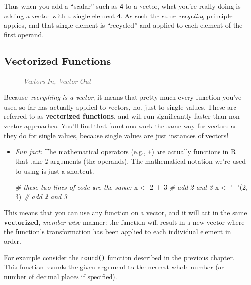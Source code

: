 \documentclass[]{book}
\newenvironment{Shaded}{\begin{snugshade}}{\end{snugshade}}
\newcommand{\DecValTok}[1]{\textcolor[rgb]{0.00,0.00,0.81}{#1}}
\newcommand{\StringTok}[1]{\textcolor[rgb]{0.31,0.60,0.02}{#1}}
\newcommand{\CommentTok}[1]{\textcolor[rgb]{0.56,0.35,0.01}{\textit{#1}}}
\newcommand{\OperatorTok}[1]{\textcolor[rgb]{0.81,0.36,0.00}{\textbf{#1}}}
\newcommand{\NormalTok}[1]{#1}
\theoremstyle{definition}
\theoremstyle{definition}
\theoremstyle{remark}
\begin{document}
Thus when you add a ``scalar'' such as \texttt{4} to a vector, what
you're really doing is adding a vector with a single element \texttt{4}.
As such the same \emph{recycling} principle applies, and that single
element is ``recycled'' and applied to each element of the first
operand.

\subsection{Vectorized Functions}\label{vectorized-functions}

\begin{quote}
\emph{Vectors In, Vector Out}
\end{quote}

Because \emph{everything is a vector}, it means that pretty much every
function you've used so far has actually applied to vectors, not just to
single values. These are referred to as \textbf{vectorized functions},
and will run significantly faster than non-vector approaches. You'll
find that functions work the same way for vectors as they do for single
values, because single values are just instances of vectors!

\begin{itemize}
\item
  \emph{Fun fact:} The mathematical operators (e.g., \texttt{+}) are
  actually functions in R that take 2 arguments (the operands). The
  mathematical notation we're used to using is just a shortcut.

\begin{Shaded}
\begin{Highlighting}[]
\CommentTok{# these two lines of code are the same:}
\NormalTok{x <-}\StringTok{ }\DecValTok{2} \OperatorTok{+}\StringTok{ }\DecValTok{3}  \CommentTok{# add 2 and 3}
\NormalTok{x <-}\StringTok{ '+'}\NormalTok{(}\DecValTok{2}\NormalTok{, }\DecValTok{3}\NormalTok{)  }\CommentTok{# add 2 and 3}
\end{Highlighting}
\end{Shaded}
\end{itemize}

This means that you can use any function on a vector, and it will act in
the same \textbf{vectorized}, \emph{member-wise} manner: the function
will result in a new vector where the function's transformation has been
applied to each individual element in order.

For example consider the \texttt{round()} function described in the
previous chapter. This function rounds the given argument to the nearest
whole number (or number of decimal places if specified).
\end{document}
